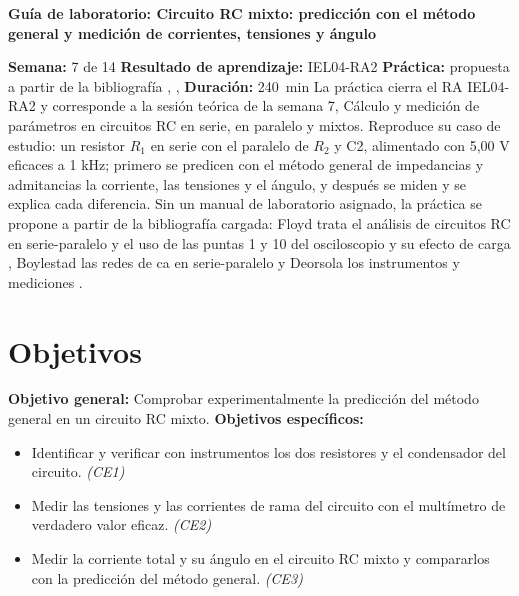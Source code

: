 \documentclass[12pt]{article}
\begin{document}
\nocite{ref1,ref2,ref3,ext1}

\datosguia
\lineablanco

{\centering\bfseries Guía de laboratorio: Circuito RC mixto: predicción con el método general y medición de corrientes, tensiones y ángulo\par}
\lineablanco
\textbf{Semana:} 7 de 14 \quad \textbf{Resultado de aprendizaje:} IEL04-RA2 \quad \textbf{Práctica:} propuesta a partir de la bibliografía \cite{ref1}, \cite{ref2}, \cite{ref3} \quad \textbf{Duración:} \SI{240}{\minute}
\lineablanco
La práctica cierra el RA IEL04-RA2 y corresponde a la sesión teórica de la semana 7, \guillemotleft{}Cálculo y medición de parámetros en circuitos RC en serie, en paralelo y mixtos\guillemotright{}. Reproduce su caso de estudio: un resistor $R_1$ en serie con el paralelo de $R_2$ y C2, alimentado con 5,00 V eficaces a 1 kHz; primero se predicen con el método general de impedancias y admitancias la corriente, las tensiones y el ángulo, y después se miden y se explica cada diferencia. Sin un manual de laboratorio asignado, la práctica se propone a partir de la bibliografía cargada: Floyd trata el análisis de circuitos RC en serie-paralelo y el uso de las puntas \texttimes{}1 y \texttimes{}10 del osciloscopio y su efecto de carga \cite{ref1}, Boylestad las redes de ca en serie-paralelo \cite{ref2} y Deorsola los instrumentos y mediciones \cite{ref3}.

\section{Objetivos}\label{sec:objetivos}
\textbf{Objetivo general:} Comprobar experimentalmente la predicción del método general en un circuito RC mixto.
\lineablanco
\textbf{Objetivos específicos:}
\begin{itemize}
  \item Identificar y verificar con instrumentos los dos resistores y el condensador del circuito. \emph{(CE1)}
  \item Medir las tensiones y las corrientes de rama del circuito con el multímetro de verdadero valor eficaz. \emph{(CE2)}
  \item Medir la corriente total y su ángulo en el circuito RC mixto y compararlos con la predicción del método general. \emph{(CE3)}
\end{itemize}
\end{document}
